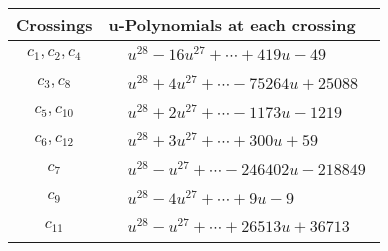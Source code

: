 \documentclass[1p]{elsarticle_modified}
\theoremstyle{definition}
\begin{document}
\begin{tabular}{m{50pt}|m{274pt}}
Crossings & \hspace{64pt}u-Polynomials at each crossing \\
\hline $$\begin{aligned}c_{1},c_{2},c_{4}\end{aligned}$$&$\begin{aligned}
&u^{28}-16 u^{27}+\cdots+419 u-49
\end{aligned}$\\
\hline $$\begin{aligned}c_{3},c_{8}\end{aligned}$$&$\begin{aligned}
&u^{28}+4 u^{27}+\cdots-75264 u+25088
\end{aligned}$\\
\hline $$\begin{aligned}c_{5},c_{10}\end{aligned}$$&$\begin{aligned}
&u^{28}+2 u^{27}+\cdots-1173 u-1219
\end{aligned}$\\
\hline $$\begin{aligned}c_{6},c_{12}\end{aligned}$$&$\begin{aligned}
&u^{28}+3 u^{27}+\cdots+300 u+59
\end{aligned}$\\
\hline $$\begin{aligned}c_{7}\end{aligned}$$&$\begin{aligned}
&u^{28}- u^{27}+\cdots-246402 u-218849
\end{aligned}$\\
\hline $$\begin{aligned}c_{9}\end{aligned}$$&$\begin{aligned}
&u^{28}-4 u^{27}+\cdots+9 u-9
\end{aligned}$\\
\hline $$\begin{aligned}c_{11}\end{aligned}$$&$\begin{aligned}
&u^{28}- u^{27}+\cdots+26513 u+36713
\end{aligned}$\\
\hline
\end{tabular}\\~\\
\newpage\renewcommand{\arraystretch}{1}
\end{document}
